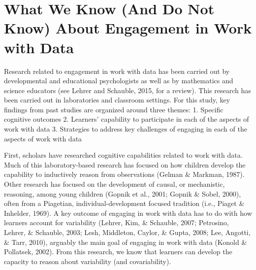 \documentclass[]{book}
\theoremstyle{definition}
\theoremstyle{definition}
\theoremstyle{definition}
\theoremstyle{remark}
\begin{document}
\section{What We Know (And Do Not Know) About Engagement in Work with
Data}\label{what-we-know-and-do-not-know-about-engagement-in-work-with-data}

Research related to engagement in work with data has been carried out by
developmental and educational psychologists as well as by mathematics
and science educators (see Lehrer and Schauble, 2015, for a review).
This research has been carried out in laboratories and classroom
settings. For this study, key findings from past studies are organized
around three themes: 1. Specific cognitive outcomes 2. Learners'
capability to participate in each of the aspects of work with data 3.
Strategies to address key challenges of engaging in each of the aspects
of work with data

First, scholars have researched cognitive capabilities related to work
with data. Much of this laboratory-based research has focused on how
children develop the capability to inductively reason from observations
(Gelman \& Markman, 1987). Other research has focused on the development
of causal, or mechanistic, reasoning, among young children (Gopnik et
al., 2001; Gopnik \& Sobel, 2000), often from a Piagetian,
individual-development focused tradition (i.e., Piaget \& Inhelder,
1969). A key outcome of engaging in work with data has to do with how
learners account for variability (Lehrer, Kim, \& Schauble, 2007;
Petrosino, Lehrer, \& Schauble, 2003; Lesh, Middleton, Caylor, \& Gupta,
2008; Lee, Angotti, \& Tarr, 2010), arguably the main goal of engaging
in work with data (Konold \& Pollatsek, 2002). From this research, we
know that learners can develop the capacity to reason about variability
(and covariability).
\end{document}
